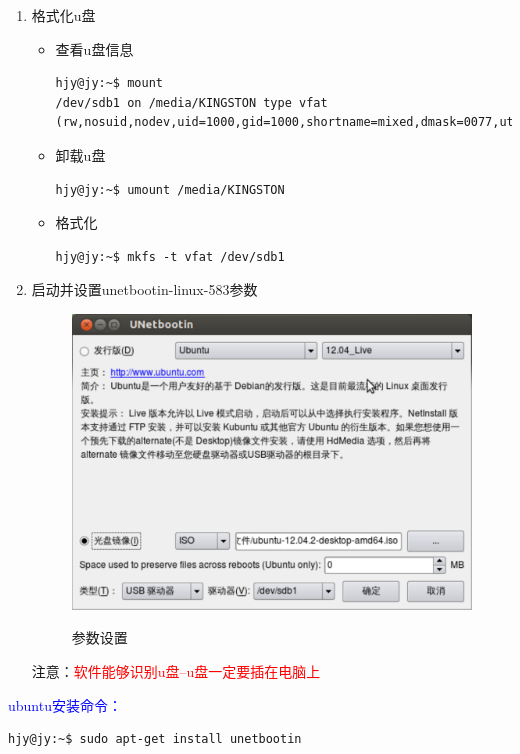 \begin{enumerate}
\item 格式化u盘
\begin{itemize}
\item 查看u盘信息
\begin{lstlisting}[style=BASH]
hjy@jy:~$ mount
/dev/sdb1 on /media/KINGSTON type vfat (rw,nosuid,nodev,uid=1000,gid=1000,shortname=mixed,dmask=0077,utf8=1,showexec,flush,uhelper=udisks)
\end{lstlisting}

\item 卸载u盘
\begin{lstlisting}[style=BASH]
hjy@jy:~$ umount /media/KINGSTON
\end{lstlisting}

\item 格式化
\begin{lstlisting}[style=BASH]
hjy@jy:~$ mkfs -t vfat /dev/sdb1
\end{lstlisting}
\end{itemize}
\item 启动并设置unetbootin-linux-583参数\\
\begin{figure}[!htbp]
	\centering
	\caption{参数设置}  
		\includegraphics[scale=0.35]{figs/ubuntu_unetbootin_set.pdf}
    	\label{fig:unetbootin_set}
\end{figure}
注意：\textcolor{red}{软件能够识别u盘--u盘一定要插在电脑上}
\end{enumerate}
\textcolor{blue}{ubuntu安装命令：}
\begin{lstlisting}[style=BASH]
hjy@jy:~$ sudo apt-get install unetbootin
\end{lstlisting}

